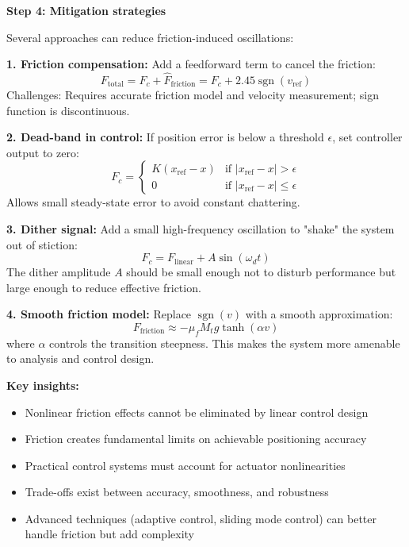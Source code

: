 \documentclass[11pt,a4paper]{article}
\begin{document}
\textbf{Step 4: Mitigation strategies}

Several approaches can reduce friction-induced oscillations:

\textbf{1. Friction compensation:}
Add a feedforward term to cancel the friction:
\begin{equation}
	F_{\text{total}} = F_c + \hat{F}_{\text{friction}} = F_c + 2.45 \operatorname{sgn}(v_{\text{ref}})
\end{equation}
Challenges: Requires accurate friction model and velocity measurement; sign function is discontinuous.

\textbf{2. Dead-band in control:}
If position error is below a threshold $\epsilon$, set controller output to zero:
\begin{equation}
	F_c = \begin{cases}
	K(x_{\text{ref}} - x) & \text{if } |x_{\text{ref}} - x| > \epsilon \\
	0 & \text{if } |x_{\text{ref}} - x| \leq \epsilon
	\end{cases}
\end{equation}
Allows small steady-state error to avoid constant chattering.

\textbf{3. Dither signal:}
Add a small high-frequency oscillation to "shake" the system out of stiction:
\begin{equation}
	F_c = F_{\text{linear}} + A\sin(\omega_d t)
\end{equation}
The dither amplitude $A$ should be small enough not to disturb performance but large enough to reduce effective friction.

\textbf{4. Smooth friction model:}
Replace $\operatorname{sgn}(v)$ with a smooth approximation:
\begin{equation}
	F_{\text{friction}} \approx -\mu_f M_t g \tanh(\alpha v)
\end{equation}
where $\alpha$ controls the transition steepness. This makes the system more amenable to analysis and control design.

\textbf{Key insights:}
\begin{itemize}
\item Nonlinear friction effects cannot be eliminated by linear control design
\item Friction creates fundamental limits on achievable positioning accuracy
\item Practical control systems must account for actuator nonlinearities
\item Trade-offs exist between accuracy, smoothness, and robustness
\item Advanced techniques (adaptive control, sliding mode control) can better handle friction but add complexity
\end{itemize}
\end{document}
